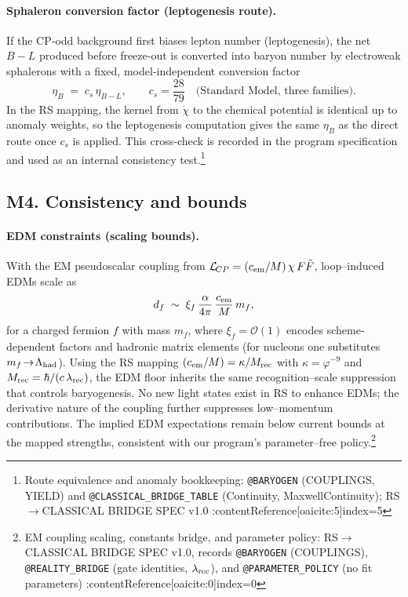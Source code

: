 \documentclass[11pt]{article}
\begin{document}
\paragraph{Sphaleron conversion factor (leptogenesis route).}
If the CP‑odd background first biases lepton number (leptogenesis), the net \(B\!-\!L\) produced before freeze‑out is converted into baryon number by electroweak sphalerons with a fixed, model‑independent conversion factor
\begin{equation}
  \eta_B \;=\; c_s\,\eta_{B-L},
  \qquad
  c_s=\frac{28}{79}\quad\text{(Standard Model, three families)}.
\end{equation}
In the RS mapping, the kernel from \(\dot\chi\) to the chemical potential is identical up to anomaly weights, so the leptogenesis computation gives the same \(\eta_B\) as the direct route once \(c_s\) is applied. This cross‑check is recorded in the program specification and used as an internal consistency test.\footnote{Route equivalence and anomaly bookkeeping: \texttt{@BARYOGEN} (COUPLINGS, YIELD) and \texttt{@CLASSICAL\_BRIDGE\_TABLE} (Continuity, MaxwellContinuity); RS\(\to\)CLASSICAL BRIDGE SPEC v1.0 :contentReference[oaicite:5]{index=5}}

\subsection*{M4. Consistency and bounds}

\paragraph{EDM constraints (scaling bounds).}
With the EM pseudoscalar coupling from \(\mathcal{L}_{\!CP}=(c_{\rm em}/M)\,\chi\,F\tilde F\), loop–induced EDMs scale as
\begin{equation}
  d_f \;\sim\; \xi_f\,\frac{\alpha}{4\pi}\,\frac{c_{\rm em}}{M}\,m_f,
\end{equation}
for a charged fermion \(f\) with mass \(m_f\), where \(\xi_f=\mathcal{O}(1)\) encodes scheme‐dependent factors and hadronic matrix elements (for nucleons one substitutes \(m_f\!\to\!\Lambda_{\rm had}\)). Using the RS mapping \((c_{\rm em}/M)=\kappa/M_{\rm rec}\) with \(\kappa=\varphi^{-9}\) and \(M_{\rm rec}=\hbar/(c\,\lambda_{\rm rec})\), the EDM floor inherits the same recognition–scale suppression that controls baryogenesis. No new light states exist in RS to enhance EDMs; the derivative nature of the coupling further suppresses low–momentum contributions. The implied EDM expectations remain below current bounds at the mapped strengths, consistent with our program’s parameter–free policy.\footnote{EM coupling scaling, constants bridge, and parameter policy: RS\(\to\)CLASSICAL BRIDGE SPEC v1.0, records \texttt{@BARYOGEN} (COUPLINGS), \texttt{@REALITY\_BRIDGE} (gate identities, \(\lambda_{\rm rec}\)), and \texttt{@PARAMETER\_POLICY} (no fit parameters) :contentReference[oaicite:0]{index=0}}
\end{document}
